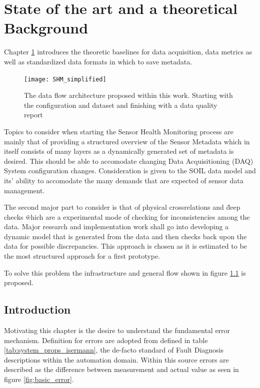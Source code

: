 

\chapter{State of the art and a theoretical Background}
\label{chap:2}

Chapter \ref{chap:2} introduces the theoretic baselines for data acquisition, data metrics as well as standardized data formats in which to save metadata.

\begin{figure}[!h]
    \centering
    \texttt{[image: SHM\_simplified]}
    \caption{The data flow architecture proposed within this work. Starting with the configuration and dataset and finishing with a data quality report}
    \label{fig:SHM_simplified}
\end{figure}
Topics to consider when starting the Sensor Health Monitoring process are mainly that of providing a structured overview of the Sensor Metadata which in itself consists of many layers as a dynamically generated set of metadata is desired. This should be able to accomodate changing Data Acquisitioning (DAQ) System configuration changes. Consideration is given to the SOIL data model and its' ability to accomodate the many demands that are expected of sensor data management. \cite{behrens_domain-specific_2021}


The second major part to consider is that of physical crossrelations and \" deep checks \" which are a experimental mode of checking for inconsistencies among the data. Major research and implementation work shall go into developing a dynamic model that is generated from the data and then checks back upon the data for possible discrepancies. This approach is chosen as it is estimated to be the most structured approach for a first prototype.


To solve this problem the infrastructure and general flow shown in figure \ref{fig:SHM_simplified} is proposed.


\section{Introduction}

Motivating this chapter is the desire to understand the fundamental error mechanism. Definition for errors are adopted from \textcite{isermann_fault-diagnosis_2006} defined in table \ref{tab:system_props_isermann}, the de-facto standard of Fault Diagnosis descriptions within the automation domain. Within this source errors are described as the difference between measurement and actual value as seen in figure \ref{fig:basic_error}.

